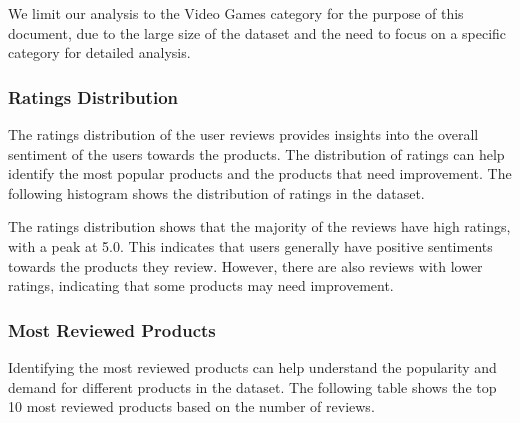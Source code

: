 \documentclass[11pt,a4paper,openany,oneside,titlepage]{article}
\begin{document}
We limit our analysis to the Video Games category for the purpose of this document, due to the large size of the dataset and the need to focus on a specific category for detailed analysis.

\subsubsection{Ratings Distribution}

The ratings distribution of the user reviews provides insights into the overall sentiment of the users towards the products. The distribution of ratings can help identify the most popular products and the products that need improvement. The following histogram shows the distribution of ratings in the dataset.


The ratings distribution shows that the majority of the reviews have high ratings, with a peak at 5.0. This indicates that users generally have positive sentiments towards the products they review. However, there are also reviews with lower ratings, indicating that some products may need improvement.

\subsubsection{Most Reviewed Products}

Identifying the most reviewed products can help understand the popularity and demand for different products in the dataset. The following table shows the top 10 most reviewed products based on the number of reviews.
\end{document}
